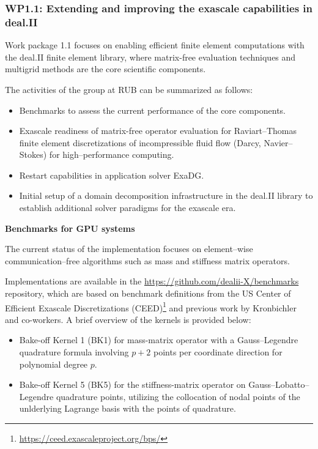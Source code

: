 \documentclass[a4paper,12pt, numbers]{article}
\begin{document}
	
	\subsubsection*{WP1.1: Extending and improving the exascale capabilities in deal.II} %

Work package 1.1 focuses on enabling efficient finite element computations
with the deal.II finite element library, where matrix-free evaluation
techniques and multigrid methods are the core scientific components.

The activities of the group at RUB can be summarized as follows:
\begin{itemize}
	\item Benchmarks to assess the current performance of the core components.
	\item Exascale readiness of matrix-free operator evaluation for
          Raviart--Thomas finite element discretizations of incompressible
          fluid flow (Darcy, Navier--Stokes) for high--performance computing.
	\item Restart capabilities in application solver ExaDG.
	\item Initial setup of a domain decomposition infrastructure in the deal.II library to establish additional solver paradigms for the exascale era.
\end{itemize}



\noindent\textbf{Benchmarks for GPU systems}

The current status of the implementation focuses on element--wise communication--free algorithms such as mass and stiffness matrix operators. 

Implementations are available in the
\url{https://github.com/dealii-X/benchmarks} repository, which are based on
benchmark definitions from the US Center of Efficient Exascale Discretizations
(CEED)\footnote{\url{https://ceed.exascaleproject.org/bps/}} and previous work by Kronbichler and co-workers. A brief overview of
the kernels is provided below:
\begin{itemize}
	\item Bake-off Kernel 1 (BK1) for mass-matrix operator with a Gauss--Legendre quadrature formula involving $p+2$ points per coordinate direction for polynomial degree $p$.
	\item Bake-off Kernel 5 (BK5) for the stiffness-matrix operator on Gauss--Lobatto--Legendre quadrature points, utilizing the collocation of nodal points of the unlderlying Lagrange basis with the points of quadrature.
\end{itemize}
\end{document}
